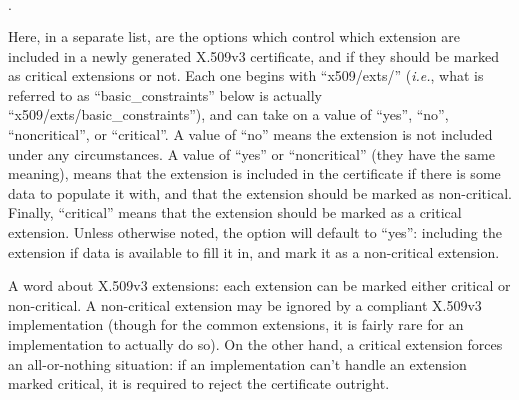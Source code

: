 \documentclass{article}
\newcommand{\ie}[0]{\emph{i.e.}}
\begin{document}
\begin{list}{$\cdot$}
  \item {}

  \item {}

  \item {}

  \item {}

  \item {}
\end{list}

Here, in a separate list, are the options which control which extension are
included in a newly generated X.509v3 certificate, and if they should be marked
as critical extensions or not. Each one begins with ``x509/exts/'' (\ie, what
is referred to as ``basic\_constraints'' below is actually
``x509/exts/basic\_constraints''), and can take on a value of ``yes'', ``no'',
``noncritical'', or ``critical''. A value of ``no'' means the extension is not
included under any circumstances. A value of ``yes'' or ``noncritical'' (they
have the same meaning), means that the extension is included in the certificate
if there is some data to populate it with, and that the extension should be
marked as non-critical. Finally, ``critical'' means that the extension should
be marked as a critical extension. Unless otherwise noted, the option will
default to ``yes'': including the extension if data is available to fill it in,
and mark it as a non-critical extension.

A word about X.509v3 extensions: each extension can be marked either critical
or non-critical. A non-critical extension may be ignored by a compliant X.509v3
implementation (though for the common extensions, it is fairly rare for an
implementation to actually do so). On the other hand, a critical extension
forces an all-or-nothing situation: if an implementation can't handle an
extension marked critical, it is required to reject the certificate outright.
\end{document}
